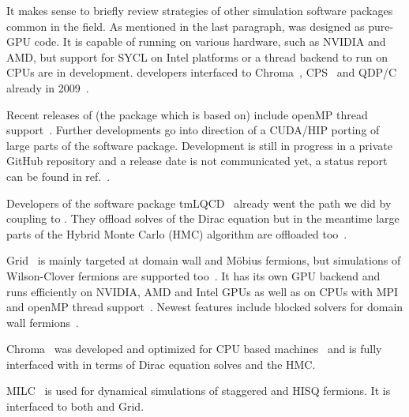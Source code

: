 It makes sense to briefly review strategies of other simulation software packages common in the field.
As mentioned in the last paragraph, \quda was designed as pure-GPU code.
It is capable of running on various hardware, such as NVIDIA and AMD, but support for SYCL on Intel platforms or a thread backend to run on CPUs are in development.
\Quda developers interfaced to Chroma~\cite{Edwards:2004sx,github:chroma}, CPS~\cite{online:cps} and QDP/C~\cite{online:qdpc} already in 2009~\cite{QUDApaper}.

Recent releases of \openqcd (the package which \openqxd is based on) include openMP thread support~\cite{online:openqcd}.
Further developments go into direction of a CUDA/HIP porting of large parts of the software package.
Development is still in progress in a private GitHub repository and a release date is not communicated yet, a status report can be found in ref.~\cite{online:openqcdongpu}.

Developers of the software package tmLQCD~\cite{jansen2009} already went the path we did by coupling to \quda.
They offload solves of the Dirac equation but in the meantime large parts of the Hybrid Monte Carlo (HMC) algorithm are offloaded too~\cite{Kostrzewa:2022,Finkenrath:2023,Garofalo:2025}.

Grid~\cite{Boyle:2015,github:grid} is mainly targeted at domain wall and Möbius fermions, but simulations of Wilson-Clover fermions are supported too~\cite{Richtmann:2019}.
It has its own GPU backend and runs efficiently on NVIDIA, AMD and Intel GPUs as well as on CPUs with MPI and openMP thread support~\cite{Yamaguchi:2022}.
Newest features include blocked solvers for domain wall fermions~\cite{Boyle:2024pio}.

Chroma~\cite{Edwards:2004sx} was developed and optimized for CPU based machines~\cite{mcclendon2001optimized} and is fully interfaced with \quda in terms of Dirac equation solves and the HMC.

MILC~\cite{github:milc,online:milc} is used for dynamical simulations of staggered and HISQ fermions.
It is interfaced to both \quda and Grid.



